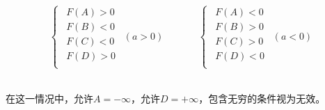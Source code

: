 \documentclass[UTF8]{ctexart}
\begin{document}
    \begin{large}
        \begin{equation*}
            \begin{cases}
                ~~F(A)>0\\[1mm]
                ~~F(B)<0\\[1mm]
                ~~F(C)<0\\[1mm]
                ~~F(D)>0\\[1mm]
            \end{cases}
            ~~(a>0)
            ~~~~~~~~~~~~~~~~
            \begin{cases}
                ~~F(A)<0\\[1mm]
                ~~F(B)>0\\[1mm]
                ~~F(C)>0\\[1mm]
                ~~F(D)<0\\[1mm]
            \end{cases}
            ~~(a<0)
        \end{equation*}
    \end{large}\\[1mm]
    在这一情况中，允许$A=-\infty$，允许$D=+\infty$，包含无穷的条件视为无效。

\newpage
\end{document}
